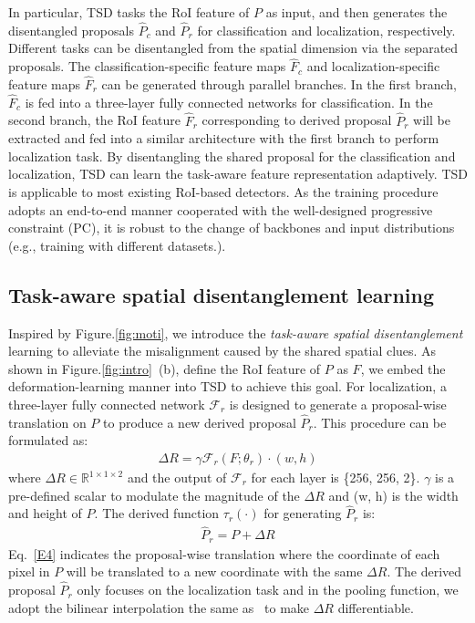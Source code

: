 \documentclass[10pt,twocolumn,letterpaper]{article}
\def \algfullname{\emph{task-aware spatial disentanglement}}
\def \algname{TSD}
\def \loss{PC}
\begin{document}
In particular, \algname{} tasks the RoI feature of $P$ as input, and then generates the
disentangled proposals $\hat{P}_c$ and $\hat{P}_r$ for classification and localization, respectively.
Different tasks can be disentangled from the spatial dimension via the separated proposals.
The classification-specific feature maps $\hat{F}_c$ and localization-specific feature maps $\hat{F}_r$ can be generated through parallel branches. 
In the first branch, $\hat{F}_c$ is fed into a three-layer fully connected networks for classification.
In the second branch, the RoI feature $\hat{F}_r$ corresponding to derived proposal $\hat{P}_r$ will be extracted and fed into a similar architecture with the first branch to perform localization task. By disentangling the shared proposal for the classification and localization, \algname{} can learn the task-aware feature representation adaptively. 
\algname{} is applicable to most existing RoI-based detectors.
As the training procedure adopts an end-to-end manner cooperated with the well-designed progressive constraint (\loss{}), it is robust to the change of backbones and input distributions (e.g., training with different datasets.).


\subsection{Task-aware spatial disentanglement learning}\label{L1}
Inspired by Figure.\ref{fig:moti}, we introduce the \algfullname{} learning to alleviate the misalignment caused by the shared spatial clues.
As shown in Figure.\ref{fig:intro}~(b), define the RoI feature of $P$ as $F$, we embed the deformation-learning manner into \algname{} to achieve this goal.
For localization, a three-layer fully connected network $\mathcal{F}_r$ is designed to generate a proposal-wise translation on $P$ to produce a new derived proposal $\hat{P}_r$. This procedure can be formulated as:
\begin{equation}
\begin{split}
\Delta R = \gamma\mathcal{F}_r (F;\theta_r) \cdot (w, h)
\end{split}
\end{equation}
where $\Delta R\in \mathbb{R}^{1\times 1 \times 2}$ and the output of $\mathcal{F}_r$ for each layer is \{256, 256, 2\}.
$\gamma$ is a pre-defined scalar to modulate the magnitude of the $\Delta R$ and (w, h) is the width and height of $P$.
The derived function $\tau_r(\cdot)$ for generating $\hat{P}_r$ is:
\begin{equation}
\begin{split}
\hat{P}_r  = P + \Delta R \label{E4}
\end{split}
\end{equation}
Eq.~\ref{E4} indicates the proposal-wise translation where the coordinate of each pixel in $P$ will be translated to a new coordinate with the same $\Delta R$.
The derived proposal $\hat{P}_r$ only focuses on the localization task and in the pooling function, we adopt the bilinear interpolation the same as~\cite{dai2017deformable} to make $\Delta R$ differentiable.
\end{document}
